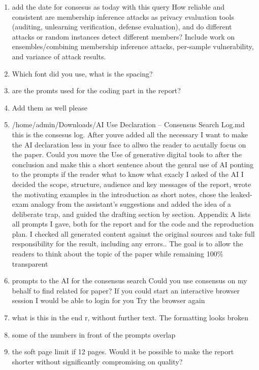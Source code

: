 \documentclass[a4paper]{article}
\newcommand{\prompt}[1]{{\raggedright\small\ttfamily\frenchspacing #1\par}}
\begin{document}
\begin{enumerate}
  \item \prompt{add the date for consesus as today with this query How reliable and consistent are membership inference attacks as privacy evaluation tools (auditing, unlearning verification, defense evaluation), and do different attacks or random instances detect different members? Include work on ensembles/combining membership inference attacks, per-sample vulnerability, and variance of attack results.}
  \item \prompt{Which font did you use, what is the spacing?}
  \item \prompt{are the promts used for the coding part in the report?}
  \item \prompt{Add them as well please}
  \item \prompt{/home/admin/Downloads/AI Use Declaration -- Consensus Search Log.md this is the consesus log. After youve added all the necessary I want to make the AI declaration less \textquotedbl{}in your face\textquotedbl{} to allwo the reader to acutally focus on the paper. Could you move the \textquotedbl{}Use of generative digital tools\textquotedbl{} to after the conclusion and make this a short sentence about the genral use of AI ponting to the prompts if the reader what to know what exacly I asked of the AI \textquotedbl{}I decided the scope, structure, audience and key messages of the report, wrote the motivating examples in the introduction as short notes, chose the leaked-exam analogy from the assistant's suggestions and added the idea of a deliberate trap, and guided the drafting section by section. Appendix A lists all prompts I gave, both for the report and for the code and the reproduction plan. I checked all generated content against the original sources and take full responsibility for the result, including any errors.\textquotedbl{}. The goal is to allow the readers to think about the topic of the paper while remaining 100\% transparent}
  \item \prompt{prompts to the AI for the consensus search Could you use consensus on my behalf to find related for paper? If you could start an interactive browser session I would be able to login for you Try the browser again}
  \item \prompt{what is this in the end \textquotedbl{}r, without further text.\textquotedbl{} The formatting looks broken}
  \item \prompt{some of the numbers in front of the prompts overlap}
  \item \prompt{the soft page limit if 12 pages. Would it be possible to make the report shorter without significantly compromising on quality?}

\end{enumerate}
\end{document}
